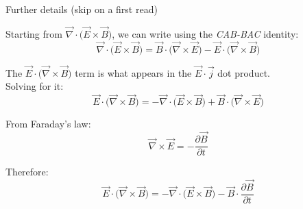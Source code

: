\begin{frame}{Further details (skip on a first read)}

Starting from $\vec{\nabla} \cdot \Big( \vec{E} \times \vec{B} \Big)$,
we can write using the {\em CAB-BAC} identity:
\begin{equation*}
 \vec{\nabla} \cdot \Big( \vec{E} \times \vec{B} \Big) =
   \vec{B} \cdot \Big( \vec{\nabla} \times \vec{E} \Big) - \vec{E} \cdot \Big( \vec{\nabla} \times \vec{B} \Big)
\end{equation*}

The $\vec{E} \cdot \Big( \vec{\nabla} \times \vec{B} \Big)$ term
is what appears in the $\vec{E} \cdot \vec{j}$ dot product.\\
Solving for it:
\begin{equation*}
 \vec{E} \cdot \Big( \vec{\nabla} \times \vec{B} \Big) =
   - \vec{\nabla} \cdot \Big( \vec{E} \times \vec{B} \Big) + \vec{B} \cdot \Big( \vec{\nabla} \times \vec{E} \Big)
\end{equation*}

From Faraday's law:
\begin{equation*}
  \vec{\nabla} \times \vec{E} = - \frac{\partial \vec{B}}{\partial t}
\end{equation*}

Therefore:
\begin{equation*}
 \vec{E} \cdot \Big( \vec{\nabla} \times \vec{B} \Big) =
  - \vec{\nabla} \cdot \Big( \vec{E} \times \vec{B} \Big) - \vec{B} \cdot \frac{\partial \vec{B}}{\partial t}
\end{equation*}

\end{frame}

%
%
%
%

